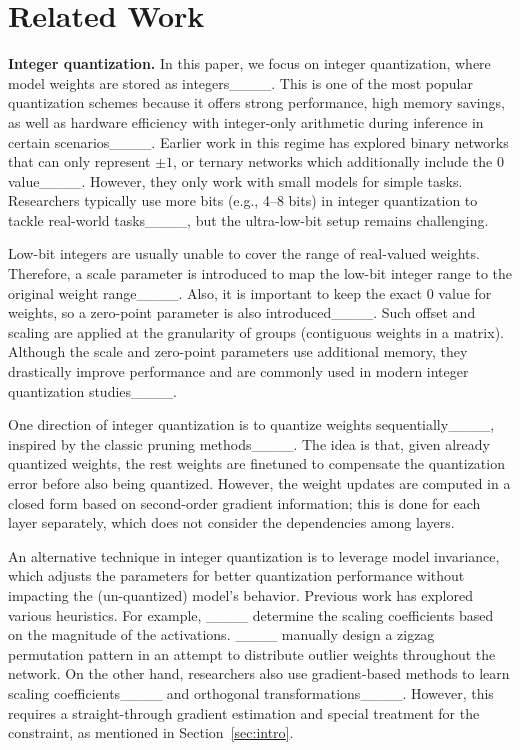 \section{Related Work}
\textbf{Integer quantization.} In this paper, we focus on integer quantization, where model weights are stored as integers____.
This is one of the most popular quantization schemes because it offers strong performance, high memory savings, as well as hardware efficiency with integer-only arithmetic during inference in certain scenarios____.
Earlier work in this regime has explored binary networks that can only represent $\pm 1$, or ternary networks which additionally include the $0$ value____. However, they only work with small models for simple tasks.
Researchers typically use more bits (e.g., 4--8 bits) in integer quantization to tackle real-world tasks____, but the ultra-low-bit setup remains challenging. 

Low-bit integers are usually unable to cover the range of real-valued weights. Therefore, a scale parameter is introduced to map the low-bit integer range to the original weight range____. Also, it is important to keep the exact 0 value for weights, so a zero-point parameter is also introduced____. Such offset and scaling are applied at the granularity of groups (contiguous weights in a matrix). Although the scale and zero-point parameters use additional memory, they drastically improve performance and are commonly used in modern integer quantization studies____.


One direction of integer quantization is to quantize weights sequentially____, inspired by the classic pruning methods____. The idea is that, given already quantized weights, the rest weights are finetuned to compensate the quantization error before also being quantized. However, the weight updates are computed in a closed form based on second-order gradient information; this is done for each layer separately, which does not consider the dependencies among layers.

An alternative technique in integer quantization is to leverage model invariance, which adjusts the parameters for better quantization performance without impacting the (un-quantized) model's behavior. Previous work has explored various heuristics. For example, ____ determine the scaling coefficients based on the magnitude of the activations. ____ manually design a zigzag permutation pattern in an attempt to distribute outlier weights throughout the network.
On the other hand, researchers also use gradient-based methods to learn scaling coefficients____ and orthogonal transformations____.
However, this requires a straight-through gradient estimation and special treatment for the constraint, as mentioned in Section~\ref{sec:intro}.

